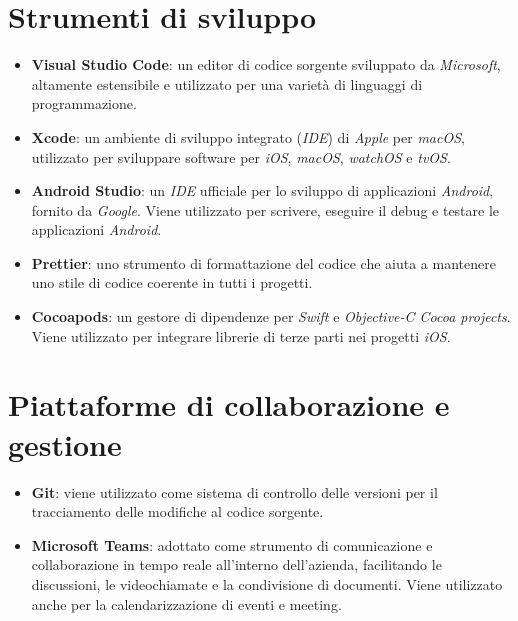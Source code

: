 \section{Strumenti di sviluppo}
\begin{itemize}
\item \textbf{Visual Studio Code}: un editor di codice sorgente sviluppato da \textit{Microsoft}, altamente estensibile e utilizzato per una varietà di linguaggi di programmazione.
\item \textbf{Xcode}: un ambiente di sviluppo integrato (\textit{IDE}) di \textit{Apple} per \textit{macOS}, utilizzato per sviluppare software per \textit{iOS}, \textit{macOS}, \textit{watchOS} e \textit{tvOS}.
\item \textbf{Android Studio}: un \textit{IDE} ufficiale per lo sviluppo di applicazioni \textit{Android}, fornito da \textit{Google}. Viene utilizzato per scrivere, eseguire il debug e testare le applicazioni \textit{Android}.
\item \textbf{Prettier}: uno strumento di formattazione del codice che aiuta a mantenere uno stile di codice coerente in tutti i progetti.
\item \textbf{Cocoapods}: un gestore di dipendenze per \textit{Swift} e \textit{Objective-C Cocoa projects}. Viene utilizzato per integrare librerie di terze parti nei progetti \textit{iOS}.
\end{itemize}

\section*{Piattaforme di collaborazione e gestione}
\begin{itemize}
\item \textbf{Git}: viene utilizzato come sistema di controllo delle versioni per il tracciamento delle modifiche al codice sorgente.
\item \textbf{Microsoft Teams}: adottato come strumento di comunicazione e collaborazione in tempo reale all'interno dell'azienda, facilitando le discussioni, le videochiamate e la condivisione di documenti. Viene utilizzato anche per la calendarizzazione di eventi e meeting.
\end{itemize}

